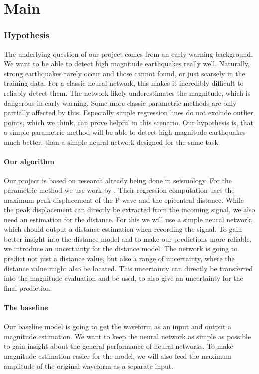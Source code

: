\documentclass[thesis.tex]{subfiles}
\begin{document}
\chapter{Main}\label{chap:basics}
\subsection{Hypothesis} 
The underlying question of our project comes from an early warning background. We want to be able to detect high magnitude earthquakes really well. Naturally, strong earthquakes rarely occur and those cannot found, or just scarsely in the training data. For a classic neural network, this makes it incredibly difficult to reliably detect them. The network likely underestimates the magnitude, which is dangerous in early warning. Some more classic parametric methods are only partially affected by this. Especially simple regression lines do not exclude outlier points, which we think, can prove helpful in this scenario. Our hypothesis is, that a simple parametric method will be able to detect high magnitude earthquakes much better, than a simple neural network designed for the same task.
\subsubsection{Our algorithm}
Our project is based on research already being done in seismology. For the parametric method we use work by \cite{kuyuk2013global}. Their regression computation uses the maximum peak displacement of the P-wave and the epicentral distance. While the peak displacement can directly be extracted from the incoming signal, we also need an estimation for the distance. For this we will use a simple neural network, which should output a distance estimation when recording the signal. To gain better insight into the distance model and to make our predictions more reliable, we introduce an uncertainty for the distance model. The network is going to predict not just a distance value, but also a range of uncertainty, where the distance value might also be located. This uncertainty can directly be transferred into the magnitude evaluation and be used, to also give an uncertainty for the final prediction.
\subsubsection{The baseline}
Our baseline model is going to get the waveform as an input and output a magnitude estimation. We want to keep the neural network as simple as possible to gain insight about the general performance of neural networks. To make magnitude estimation easier for the model, we will also feed the maximum amplitude of the original waveform as a separate input. 
\end{document}
